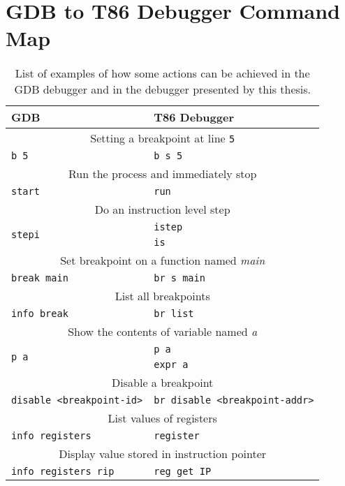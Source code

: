 \chapter{GDB to T86 Debugger Command Map}

\begin{table}[h]
\centering
\setlength\doublerulesep{0.15cm} 
\begin{tabular}{|p{6cm}|p{6cm}|}
    \hline
    GDB & T86 Debugger \\
    \hline
    \hline
    
    \multicolumn{2}{|c|}{Setting a breakpoint at line \texttt{5}}\\
    \hline
    \texttt{b 5} & \texttt{b s 5} \\
    \hline
    \hline
    
    \multicolumn{2}{|c|}{Run the process and immediately stop}\\
    \hline
    \texttt{start} & \texttt{run} \\
    \hline
    \hline
    
    \multicolumn{2}{|c|}{Do an instruction level step}\\
    \hline
    \multirow{2}{*}{\texttt{stepi}} & \texttt{istep} \\
    & \texttt{is} \\
    \hline
    \hline
        
    \multicolumn{2}{|c|}{Set breakpoint on a function named \textit{main}}\\
    \hline
    \texttt{break main} & \texttt{br s main} \\
    \hline
    \hline
        
    \multicolumn{2}{|c|}{List all breakpoints}\\
    \hline
    \texttt{info break} & \texttt{br list} \\
    \hline
    \hline
        
    \multicolumn{2}{|c|}{Show the contents of variable named \textit{a}}\\
    \hline
    \multirow{2}{*}{\texttt{p a}} & \texttt{p a} \\
    & \texttt{expr a} \\
    \hline
    \hline
        
    \multicolumn{2}{|c|}{Disable a breakpoint}\\
    \hline
    \texttt{disable <breakpoint-id>} & \texttt{br disable <breakpoint-addr>} \\
    \hline
    \hline

    \multicolumn{2}{|c|}{List values of registers}\\
    \hline
    \texttt{info registers} & \texttt{register} \\
    \hline
    \hline

    \multicolumn{2}{|c|}{Display value stored in instruction pointer}\\
    \hline
    \texttt{info registers rip} & \texttt{reg get IP} \\
    \hline
\end{tabular}
\caption{List of examples of how some actions can be achieved in the GDB debugger and in
the debugger presented by this thesis.}
\label{table:gdb-vs-dbg}
\end{table}
